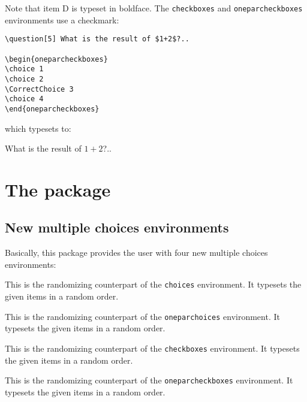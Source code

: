 \documentclass[12pt,a4paper]{exam}
\begin{document}
Note that item D is typeset in boldface. The \texttt{checkboxes} and \texttt{oneparcheckboxes}
environments use a checkmark:

\begin{lstlisting}
\question[5] What is the result of $1+2$?..

\begin{oneparcheckboxes}
\choice 1
\choice 2
\CorrectChoice 3
\choice 4
\end{oneparcheckboxes}
\end{lstlisting}

which typesets to:

\begin{questions}
\setcounter{question}{5}
\question[5] What is the result of $1+2$?..

\begin{oneparcheckboxes}
\end{oneparcheckboxes}
\end{questions}

\noprintanswers

\section{The package}

\subsection{New multiple choices environments}
Basically, this package provides the user with four new multiple choices
environments:

\begin{description}[labelindent=2ex]
\item[\texttt{randomizechoices}] This is the randomizing counterpart of the
\texttt{choices} environment. It typesets the given items in a random order.

\item[\texttt{randomizeoneparchoices}] This is the randomizing counterpart of the
\texttt{oneparchoices} environment. It typesets the given items in a random order.

\item[\texttt{randomizecheckboxes}] This is the randomizing counterpart of the
\texttt{checkboxes} environment. It typesets the given items in a random order.

\item[\texttt{randomizeoneparcheckboxes}] This is the randomizing counterpart of the
\texttt{oneparcheckboxes} environment. It typesets the given items in a random order.

\end{description}
\end{document}
